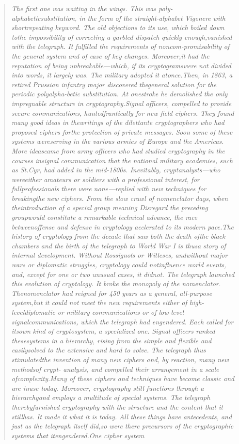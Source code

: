 \documentclass[12pt,a4paper]{article}
\newenvironment{cryptotext}{\begin{quote}\raggedright\itshape\small}{\end{quote}}
\begin{document}
\begin{cryptotext}
The first one was waiting in the wings. This was poly-alphabeticsubstitution, in the form of the straight-alphabet Vigenere with shortrepeating keyword. The old objections to its use, which boiled down tothe impossibility of correcting a garbled dispatch quickly enough,vanished with the telegraph. It fulfilled the requirements of noncom-promisability of the general system and of ease of key changes. Moreover,it had the reputation of being unbreakable---which, if its cryptogramswere not divided into words, it largely was. The military adopted it atonce.Then, in 1863, a retired Prussian infantry major discovered thegeneral solution for the periodic polyalpha-betic substitution. At onestroke he demolished the only impregnable structure in cryptography.Signal officers, compelled to provide secure communications, huntedfrantically for new field ciphers. They found many good ideas in thewritings of the dilettante cryptographers who had proposed ciphers forthe protection of private messages. Soon some of these systems wereserving in the various armies of Europe and the Americas. More ideascame from army officers who had studied cryptography in the courses insignal communication that the national military academies, such as St.Cyr, had added in the mid-1800s. Inevitably, cryptanalysts---who wereeither amateurs or soldiers with a professional interest, for fullprofessionals there were none---replied with new techniques for breakingthe new ciphers. From the slow crawl of nomenclator days, when theintroduction of a special group meaning Disregard the preceding groupwould constitute a remarkable technical advance, the race betweenoffense and defense in cryptology acclerated to its modern pace.The history of cryptology from the decade that saw both the death ofthe black chambers and the birth of the telegraph to World War I is thusa story of internal development. Without Rossignols or Willeses, andwithout major wars or diplomatic struggles, cryptology could notinfluence world events, and, except for one or two unusual cases, it didnot. The telegraph launched this evolution of cryptology. It broke the monopoly of the nomenclator. Thenomenclator had reigned for 450 years as a general, all-purpose system,but it could not meet the new requirements either of high-leveldiplomatic or military communications or of low-level signalcommunications, which the telegraph had engendered. Each called for itsown kind of cryptosystem, a specialized one. Signal officers ranked thesesystems in a hierarchy, rising from the simple and flexible and easilysolved to the extensive and hard to solve. The telegraph thus stimulatedthe invention of many new ciphers and, by reaction, many new methodsof crypt- analysis, and compelled their arrangement in a scale ofcomplexity.Many of these ciphers and techniques have become classic and are inuse today. Moreover, cryptography still functions through a hierarchyand employs a multitude of special systems. The telegraph therebyfurnished cryptography with the structure and the content that it stillhas. It made it what it is today. All these things have antecedents, and just as the telegraph itself did,so were there precursors of the cryptographic systems that itengendered.One cipher system 
\end{cryptotext}
\end{document}

